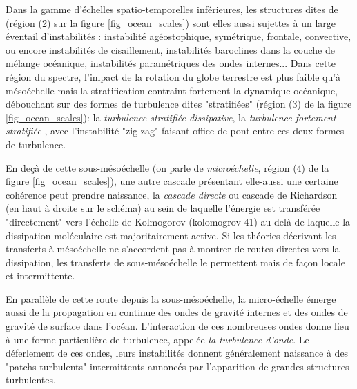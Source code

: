 Dans la gamme d'échelles spatio-temporelles inférieures, les structures dites de  (région (2) sur la figure \ref{fig_ocean_scales}) sont elles aussi sujettes à un large éventail d'instabilités \citep{mcwilliams_submesoscale_2016}: instabilité agéostophique, symétrique, frontale, convective, ou encore instabilités de cisaillement, instabilités baroclines dans la couche de mélange océanique, instabilités paramétriques des ondes internes... Dans cette région du spectre, l'impact de la rotation du globe terrestre est plus faible qu'à mésoéchelle mais la stratification contraint fortement la dynamique océanique, débouchant sur des formes de turbulence dites "stratifiées" (région (3) de la figure \ref{fig_ocean_scales}): la \textit{turbulence stratifiée dissipative}, la \textit{turbulence fortement stratifiée} \citep{augier_turbulence_2012}, avec l'instabilité "zig-zag" faisant office de pont entre ces deux formes de turbulence.

En deçà de cette sous-mésoéchelle (on parle de \textit{microéchelle}, région (4) de la figure \ref{fig_ocean_scales}), une autre cascade présentant elle-aussi une certaine cohérence peut prendre naissance, la \textit{cascade directe} ou cascade de Richardson (en haut à droite sur le schéma) au sein de laquelle l'énergie est transférée "directement" vers l'échelle de \color{red}Kolmogorov (kolomogrov 41)\color{black} au-delà de laquelle la dissipation moléculaire est majoritairement active. Si les théories décrivant les transferts à mésoéchelle ne s'accordent pas à montrer de routes directes vers la dissipation, les transferts de sous-mésoéchelle le permettent mais de façon locale et intermittente.

En parallèle de cette route depuis la sous-mésoéchelle, la micro-échelle émerge aussi de la propagation en continue des ondes de gravité internes et des ondes de gravité de surface dans l'océan. L'interaction de ces nombreuses ondes donne lieu à une forme particulière de turbulence, appelée \textit{la turbulence d'onde}. Le déferlement de ces ondes, leurs instabilités donnent généralement naissance à des "patchs turbulents" intermittents annoncés par l'apparition de grandes structures turbulentes.


